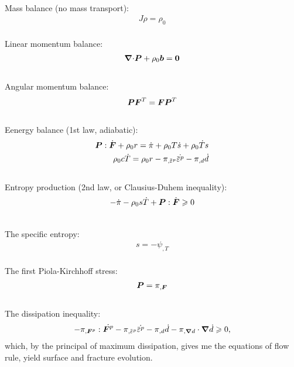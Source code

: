 \begin{frame}{}
 \\
Mass balance (no mass transport):
\begin{align}
    J\rho = \rho_0
\end{align} \\
Linear momentum balance:
\begin{align}
    {\boldsymbol{\nabla}\cdot} \boldsymbol{P} + \rho_0 \boldsymbol{b} = \boldsymbol{0}
\end{align} \\
Angular momentum balance:
\begin{align}
    \boldsymbol{P} \boldsymbol{F}^T = \boldsymbol{F} \boldsymbol{P}^T
\end{align} \\
Eenergy balance (1st law, adiabatic):
\begin{align}
    \bs{P} : \dot{\defgrad} + \rho_0 r = \dot{\pi} + \rho_0 T \dot{s} + \rho_0 \dot{T} s \\
    \rho_0 c \dot{T} = \rho_0 r - \pi_{, \plasticstrain}\dot{\plasticstrain} - \pi_{, d} \dot{d}
\end{align} \\
Entropy production (2nd law, or Clausius-Duhem inequality):
\begin{align}
    -\dot{\pi} - \rho_0 s \dot{T} + \boldsymbol{P} : \dot{\boldsymbol{F}} \geqslant 0
\end{align}
\end{frame}

\begin{frame}{}
 \\
The specific entropy:
\begin{align}
    s = -\psi_{, T}
\end{align} \\
The first Piola-Kirchhoff stress:
\begin{align}
    \boldsymbol{P} = \pi_{, \boldsymbol{F}}
\end{align} \\
The dissipation inequality:
\begin{align}
    - \pi_{, \defgrad^p} : \dot{\defgrad^p} - \pi_{, \plasticstrain}\dot{\plasticstrain} - \pi_{, d} \dot{d} - \pi_{, \grad d} \cdot \grad \dot{d} \geqslant 0,
\end{align}
which, by the principal of maximum dissipation, gives me the equations of flow rule, yield surface and fracture evolution.
\end{frame}

